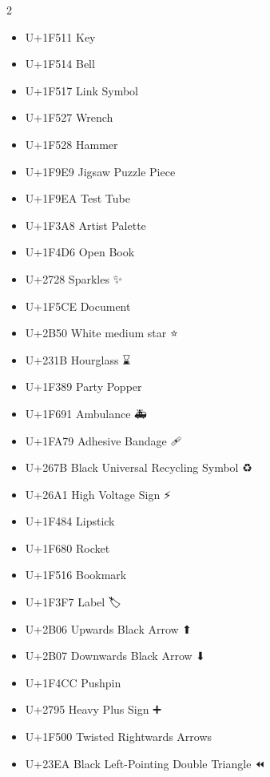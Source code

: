 \begin{multicols}{2}
\begin{itemize}
    \item U+1F511 Key                                🔑
    \item U+1F514 Bell                               🔔
    \item U+1F517 Link Symbol                        🔗
    \item U+1F527 Wrench                             🔧
    \item U+1F528 Hammer                             🔨
    \item U+1F9E9 Jigsaw Puzzle Piece              🧩
    \item U+1F9EA Test Tube                        🧪
    \item U+1F3A8 Artist Palette                   🎨
    \item U+1F4D6 Open Book                        📖
    \item U+2728  Sparkles                         ✨
    \item U+1F5CE Document                           %
    \item U+2B50 White medium star                   ⭐
    \item U+231B Hourglass                           ⌛
    \item U+1F389 Party Popper                     🎉
    \item U+1F691 Ambulance                        🚑
    \item U+1FA79 Adhesive Bandage                 🩹
    \item U+267B  Black Universal Recycling Symbol ♻
    \item U+26A1  High Voltage Sign                ⚡
    \item U+1F484 Lipstick                         💄
    \item U+1F680 Rocket                           🚀
    \item U+1F516 Bookmark                         🔖
    \item U+1F3F7 Label                            🏷
    \item U+2B06  Upwards Black Arrow              ⬆
    \item U+2B07  Downwards Black Arrow            ⬇
    \item U+1F4CC Pushpin                          📌
    \item U+2795  Heavy Plus Sign                  ➕
    \item U+1F500 Twisted Rightwards Arrows        🔀
    \item U+23EA  Black Left-Pointing Double Triangle ⏪

\end{itemize}
\end{multicols}
